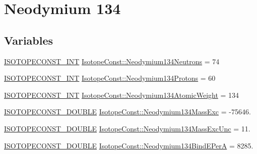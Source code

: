 \hypertarget{group___isotope_const-_neodymium-_nd134}{}\section{Neodymium 134}
\label{group___isotope_const-_neodymium-_nd134}
\subsection*{Variables}
\begin{DoxyCompactItemize}
\item 
\mbox{\hyperlink{group___isotope_const-_macros_ga5f18360b3e99483a35c32d789e62621c}{I\+S\+O\+T\+O\+P\+E\+C\+O\+N\+S\+T\+\_\+\+I\+NT}} \mbox{\hyperlink{group___isotope_const-_neodymium-_nd134_ga6a6f70886d5dc15bcb817665d78823e0}{Isotope\+Const\+::\+Neodymium134\+Neutrons}} = 74
\item 
\mbox{\hyperlink{group___isotope_const-_macros_ga5f18360b3e99483a35c32d789e62621c}{I\+S\+O\+T\+O\+P\+E\+C\+O\+N\+S\+T\+\_\+\+I\+NT}} \mbox{\hyperlink{group___isotope_const-_neodymium-_nd134_ga0065b1d752e59a684aabcd875ca4a01d}{Isotope\+Const\+::\+Neodymium134\+Protons}} = 60
\item 
\mbox{\hyperlink{group___isotope_const-_macros_ga5f18360b3e99483a35c32d789e62621c}{I\+S\+O\+T\+O\+P\+E\+C\+O\+N\+S\+T\+\_\+\+I\+NT}} \mbox{\hyperlink{group___isotope_const-_neodymium-_nd134_ga81c4486fca81d7003846e3708d4846aa}{Isotope\+Const\+::\+Neodymium134\+Atomic\+Weight}} = 134
\item 
\mbox{\hyperlink{group___isotope_const-_macros_ga8f45a7272ce02c0b4c65c44636ed719a}{I\+S\+O\+T\+O\+P\+E\+C\+O\+N\+S\+T\+\_\+\+D\+O\+U\+B\+LE}} \mbox{\hyperlink{group___isotope_const-_neodymium-_nd134_ga82520eb89b954c305bd2f33d7301d45b}{Isotope\+Const\+::\+Neodymium134\+Mass\+Exc}} = -\/75646.
\item 
\mbox{\hyperlink{group___isotope_const-_macros_ga8f45a7272ce02c0b4c65c44636ed719a}{I\+S\+O\+T\+O\+P\+E\+C\+O\+N\+S\+T\+\_\+\+D\+O\+U\+B\+LE}} \mbox{\hyperlink{group___isotope_const-_neodymium-_nd134_ga19f460e87d4b43a2238761df2bd114af}{Isotope\+Const\+::\+Neodymium134\+Mass\+Exc\+Unc}} = 11.
\item 
\mbox{\hyperlink{group___isotope_const-_macros_ga8f45a7272ce02c0b4c65c44636ed719a}{I\+S\+O\+T\+O\+P\+E\+C\+O\+N\+S\+T\+\_\+\+D\+O\+U\+B\+LE}} \mbox{\hyperlink{group___isotope_const-_neodymium-_nd134_gaa7e023eac3d228e7051a57a777e9f6a7}{Isotope\+Const\+::\+Neodymium134\+Bind\+E\+PerA}} = 8285.
\item 

\end{DoxyCompactItemize}
